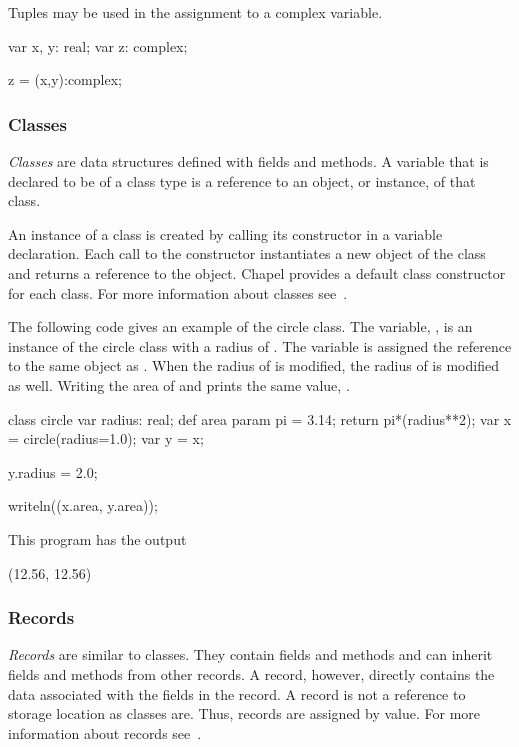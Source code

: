 \begin{example}
Tuples may be used in the assignment to a complex variable.
\begin{chapel}
var x, y: real;
var z: complex;

z = (x,y):complex;
\end{chapel}
\end{example}

\subsubsection{Classes}
\emph{Classes} are data structures defined with fields and methods.
A variable that is declared to be of a class type is a reference to an
object, or instance, of that class.
 
An instance of a class is created by calling its constructor in a
variable declaration.  Each call to the constructor instantiates a new
object of the class and returns a reference to the object.  Chapel
provides a default class constructor for each class.  For more
information about classes see~.

\begin{example}
The following code gives an example of the circle class.  The
variable, , is an instance of the circle class with a radius
of .  The variable  is assigned the reference to the
same object as .  When the radius of  is modified, the
radius of  is modified as well.  Writing the area of 
and  prints the same value, .
\begin{chapel}
class circle {
  var radius: real;
  def area {
    param pi = 3.14;
    return pi*(radius**2);
  }
}
var x = circle(radius=1.0);
var y = x;

y.radius = 2.0;

writeln((x.area, y.area));
\end{chapel}

This program has the output
\begin{commandline}
(12.56, 12.56)
\end{commandline}
\end{example}

\subsubsection{Records}
\emph{Records} are similar to classes.  They contain fields and methods
and can inherit fields and methods from other records.  A record,
however, directly contains the data associated with the fields in the
record.  A record is not a reference to storage location as classes
are.  Thus, records are assigned by value.  For more information about
records see~.

